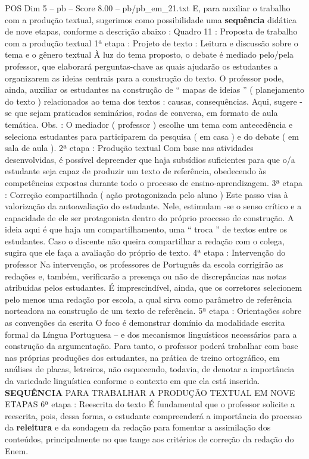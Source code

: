 \begin{textsample}{POS Dim 5 – pb – Score 8.00 – pb/pb\_em\_21.txt}
E, para auxiliar o trabalho com a produção textual, sugerimos como possibilidade uma \textbf{sequência} didática de nove etapas, conforme a descrição abaixo : Quadro 11 : Proposta de trabalho com a produção textual 1ª etapa : Projeto de texto : Leitura e discussão sobre o tema e o gênero textual À luz do tema proposto, o debate é mediado pelo/pela professor, que elaborará perguntas-chave as quais ajudarão os estudantes a organizarem as ideias centrais para a construção do texto.
O professor pode, ainda, auxiliar os estudantes na construção de “ mapas de ideias ” ( planejamento do texto ) relacionados ao tema dos textos : causas, consequências.
Aqui, sugere -se que sejam praticados seminários, rodas de conversa, em formato de aula temática.
Obs. : O mediador ( professor ) escolhe um tema com antecedência e seleciona estudantes para participarem da pesquisa ( em casa ) e do debate ( em sala de aula ). 2ª etapa : Produção textual Com base nas atividades desenvolvidas, é possível depreender que haja subsídios suficientes para que o/a estudante seja capaz de produzir um texto de referência, obedecendo às competências expostas durante todo o processo de ensino-aprendizagem. 3ª etapa : Correção compartilhada ( ação protagonizada pelo aluno ) Este passo visa à valorização da autoavaliação do estudante.
Nele, estimulam -se o senso crítico e a capacidade de ele ser protagonista dentro do próprio processo de construção.
A ideia aqui é que haja um compartilhamento, uma “ troca ” de textos entre os estudantes.
Caso o discente não queira compartilhar a redação com o colega, sugira que ele faça a avaliação do próprio de texto. 4ª etapa : Intervenção do professor Na intervenção, os professores de Português da escola corrigirão as redações e, também, verificarão a presença ou não de discrepâncias nas notas atribuídas pelos estudantes.
É imprescindível, ainda, que os corretores selecionem pelo menos uma redação por escola, a qual sirva como parâmetro de referência norteadora na construção de um texto de referência. 5ª etapa : Orientações sobre as convenções da escrita O foco é demonstrar domínio da modalidade escrita formal da Língua Portuguesa – e dos mecanismos linguísticos necessários para a construção da argumentação.
Para tanto, o professor poderá trabalhar com base nas próprias produções dos estudantes, na prática de treino ortográfico, em análises de placas, letreiros, não esquecendo, todavia, de denotar a importância da variedade linguística conforme o contexto em que ela está inserida. \textbf{SEQUÊNCIA} PARA TRABALHAR A PRODUÇÃO TEXTUAL EM NOVE ETAPAS 6ª etapa : Reescrita do texto É fundamental que o professor solicite a reescrita, pois, dessa forma, o estudante compreenderá a importância do processo da \textbf{releitura} e da sondagem da redação para fomentar a assimilação dos conteúdos, principalmente no que tange aos critérios de correção da redação do Enem.

\end{textsample}
